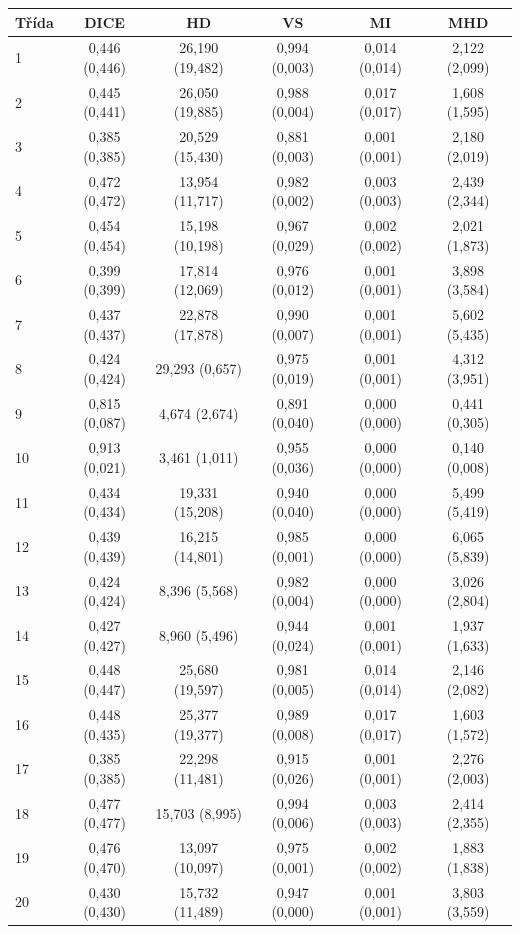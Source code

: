 \begin{tabular}{l c c c c c}
 \hline
Třída & DICE & HD & VS & MI & MHD \\ \hline
1 & 0,446 (0,446) & 26,190 (19,482) & 0,994 (0,003) & 0,014 (0,014) & 2,122 (2,099) \\
2 & 0,445 (0,441) & 26,050 (19,885) & 0,988 (0,004) & 0,017 (0,017) & 1,608 (1,595) \\
3 & 0,385 (0,385) & 20,529 (15,430) & 0,881 (0,003) & 0,001 (0,001) & 2,180 (2,019) \\
4 & 0,472 (0,472) & 13,954 (11,717) & 0,982 (0,002) & 0,003 (0,003) & 2,439 (2,344) \\
5 & 0,454 (0,454) & 15,198 (10,198) & 0,967 (0,029) & 0,002 (0,002) & 2,021 (1,873) \\
6 & 0,399 (0,399) & 17,814 (12,069) & 0,976 (0,012) & 0,001 (0,001) & 3,898 (3,584) \\
7 & 0,437 (0,437) & 22,878 (17,878) & 0,990 (0,007) & 0,001 (0,001) & 5,602 (5,435) \\
8 & 0,424 (0,424) & 29,293 (0,657) & 0,975 (0,019) & 0,001 (0,001) & 4,312 (3,951) \\
9 & 0,815 (0,087) & 4,674 (2,674) & 0,891 (0,040) & 0,000 (0,000) & 0,441 (0,305) \\
10 & 0,913 (0,021) & 3,461 (1,011) & 0,955 (0,036) & 0,000 (0,000) & 0,140 (0,008) \\
11 & 0,434 (0,434) & 19,331 (15,208) & 0,940 (0,040) & 0,000 (0,000) & 5,499 (5,419) \\
12 & 0,439 (0,439) & 16,215 (14,801) & 0,985 (0,001) & 0,000 (0,000) & 6,065 (5,839) \\
13 & 0,424 (0,424) & 8,396 (5,568) & 0,982 (0,004) & 0,000 (0,000) & 3,026 (2,804) \\
14 & 0,427 (0,427) & 8,960 (5,496) & 0,944 (0,024) & 0,001 (0,001) & 1,937 (1,633) \\
15 & 0,448 (0,447) & 25,680 (19,597) & 0,981 (0,005) & 0,014 (0,014) & 2,146 (2,082) \\
16 & 0,448 (0,435) & 25,377 (19,377) & 0,989 (0,008) & 0,017 (0,017) & 1,603 (1,572) \\
17 & 0,385 (0,385) & 22,298 (11,481) & 0,915 (0,026) & 0,001 (0,001) & 2,276 (2,003) \\
18 & 0,477 (0,477) & 15,703 (8,995) & 0,994 (0,006) & 0,003 (0,003) & 2,414 (2,355) \\
19 & 0,476 (0,470) & 13,097 (10,097) & 0,975 (0,001) & 0,002 (0,002) & 1,883 (1,838) \\
20 & 0,430 (0,430) & 15,732 (11,489) & 0,947 (0,000) & 0,001 (0,001) & 3,803 (3,559) \\

\end{tabular}
